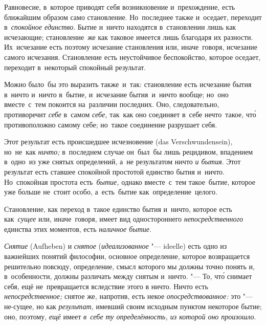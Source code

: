 Равновесие, в~которое приводят себя возникновение и~прехождение, есть ближайшим
образом само становление. Но~последнее также и~оседает, переходит
в~{\em спокойное единство}. Бытие и~ничто находятся в~становлении лишь как
исчезающие; становление~же как таковое имеется лишь благодаря их разности.
Их~исчезание есть поэтому исчезание становления или, иначе~говоря, исчезание
самого исчезания. Становление есть неустойчивое беспокойство, которое оседает,
переходит в~некоторый спокойный результат.

Можно было~бы это выразить также~и~так: становление есть исчезание бытия
в~ничто и~ничто в~бытие, и~исчезание бытия~и~ничто вообще; но~оно вместе~с~тем
покоится на~различии последних. Оно, следовательно, противоречит {\em себе}
в~самом {\em себе,} так~как оно соединяет в~себе нечто~такое, чт\'{о}
противоположно самому себе; но~такое соединение разрушает себя.

Этот результат есть происшедшее исчезновение (das Ver\-schwun\-den\-sein),
но~не~как {\em ничто;} в~последнем случае он~был~бы лишь рецидивом, впадением
в~одно~из уже снятых определений, а~не результатом ничто {\em и бытия}. Этот
результат есть ставшее спокойной простотой единство бытия и~ничто. Но~спокойная
простота есть~{\em бытие,} однако вместе~с~тем такое~бытие, которое уже больше
не~стоит особо, а~есть~бытие как~определение~целого.

Становление, как переход в~такое единство бытия и~ничто, которое есть
как~{\em сущее} или, иначе~говоря, имеет вид одностороннего
{\em непосредственного} единства этих моментов, есть {\em наличное бытие}.


{\em Снятие} (Aufheben) и {\em снятое} ({\em идеализованное} "--- ideelle) есть
одно из важнейших понятий философии, основное определение, которое возвращается
решительно повсюду, определение, смысл которого мы должны точно понять и,
в~особенности, должны различать между снятым и~ничто. "--- То, чт\'{о} снимает
себя, ещё не~превращается вследствие этого в ничто. Ничто есть {\em
непосредственное;} снятое же, напротив, есть некое {\em опосредствованное:} это
"--- не-сущее, но как {\em результат,} имевший своим исходным пунктом некоторое
бытие; оно, поэтому, {\em ещё} имеет {\em в~себе ту определённость, из которой
оно произошло}.

